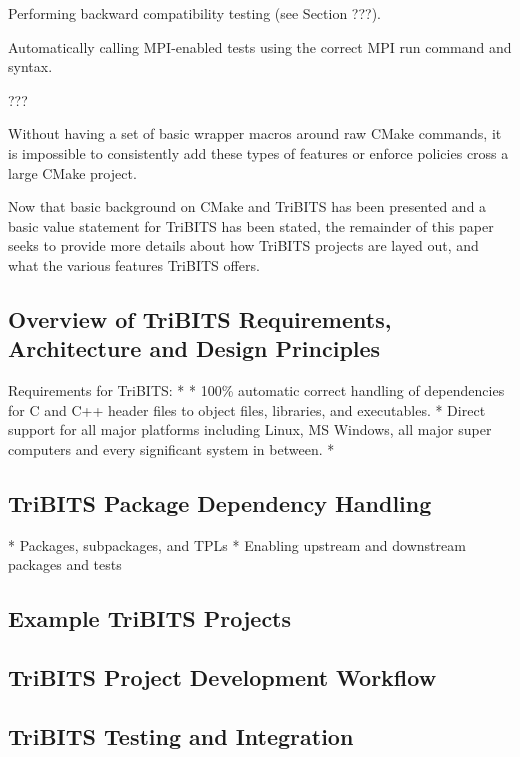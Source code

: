 \documentclass[10pt]{article}
\begin{document}
\begin{compactitem}
\item Performing backward compatibility testing (see Section ???).
\item Automatically calling MPI-enabled tests using the correct MPI run command and syntax.
\item ???
\end{compactitem}

Without having a set of basic wrapper macros around raw CMake commands, it is impossible to consistently add these types of features or enforce policies cross a large CMake project.

Now that basic background on CMake and TriBITS has been presented and a basic value statement for TriBITS has been stated, the remainder of this paper seeks to provide more details about how TriBITS projects are layed out, and what the various features TriBITS offers.

%
\subsection{Overview of TriBITS Requirements, Architecture and Design Principles}
%

Requirements for TriBITS:
* 
* 100\% automatic correct handling of dependencies for C and C++ header files to object files, libraries, and executables.
* Direct support for all major platforms including Linux, MS Windows,  all major super computers and every significant system in between.
* 




%
\subsection{TriBITS Package Dependency Handling}
%

* Packages, subpackages, and TPLs
* Enabling upstream and downstream packages and tests

%
\subsection{Example TriBITS Projects}
%



%
\subsection{TriBITS Project Development Workflow}
%


%
\subsection{TriBITS Testing and Integration}
%
\end{document}

